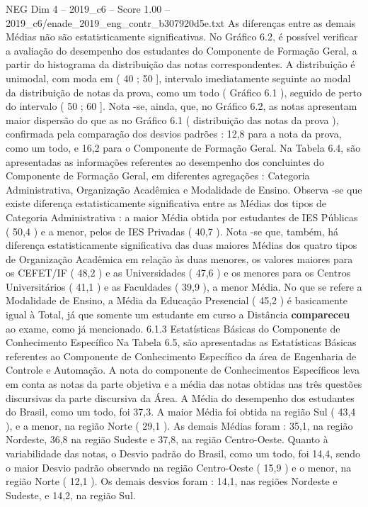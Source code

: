 \begin{textsample}{NEG Dim 4 – 2019\_c6 – Score 1.00 – 2019\_c6/enade\_2019\_eng\_contr\_b307920d5e.txt}
As diferenças entre as demais Médias não são estatisticamente significativas.
No Gráfico 6.2, é possível verificar a avaliação do desempenho dos estudantes do Componente de Formação Geral, a partir do histograma da distribuição das notas correspondentes.
A distribuição é unimodal, com moda em ( 40 ; 50 ], intervalo imediatamente seguinte ao modal da distribuição de notas da prova, como um todo ( Gráfico 6.1 ), seguido de perto do intervalo ( 50 ; 60 ].
Nota -se, ainda, que, no Gráfico 6.2, as notas apresentam maior dispersão do que as no Gráfico 6.1 ( distribuição das notas da prova ), confirmada pela comparação dos desvios padrões : 12,8 para a nota da prova, como um todo, e 16,2 para o Componente de Formação Geral.
Na Tabela 6.4, são apresentadas as informações referentes ao desempenho dos concluintes do Componente de Formação Geral, em diferentes agregações : Categoria Administrativa, Organização Acadêmica e Modalidade de Ensino.
Observa -se que existe diferença estatisticamente significativa entre as Médias dos tipos de Categoria Administrativa : a maior Média obtida por estudantes de IES Públicas ( 50,4 ) e a menor, pelos de IES Privadas ( 40,7 ).
Nota -se que, também, há diferença estatisticamente significativa das duas maiores Médias dos quatro tipos de Organização Acadêmica em relação às duas menores, os valores maiores para os CEFET/IF ( 48,2 ) e as Universidades ( 47,6 ) e os menores para os Centros Universitários ( 41,1 ) e as Faculdades ( 39,9 ), a menor Média.
No que se refere a Modalidade de Ensino, a Média da Educação Presencial ( 45,2 ) é basicamente igual à Total, já que somente um estudante em curso a Distância \textbf{compareceu} ao exame, como já mencionado. 6.1.3 Estatísticas Básicas do Componente de Conhecimento Específico Na Tabela 6.5, são apresentadas as Estatísticas Básicas referentes ao Componente de Conhecimento Específico da área de Engenharia de Controle e Automação.
A nota do componente de Conhecimentos Específicos leva em conta as notas da parte objetiva e a média das notas obtidas nas três questões discursivas da parte discursiva da Área.
A Média do desempenho dos estudantes do Brasil, como um todo, foi 37,3.
A maior Média foi obtida na região Sul ( 43,4 ), e a menor, na região Norte ( 29,1 ).
As demais Médias foram : 35,1, na região Nordeste, 36,8 na região Sudeste e 37,8, na região Centro-Oeste.
Quanto à variabilidade das notas, o Desvio padrão do Brasil, como um todo, foi 14,4, sendo o maior Desvio padrão observado na região Centro-Oeste ( 15,9 ) e o menor, na região Norte ( 12,1 ).
Os demais desvios foram : 14,1, nas regiões Nordeste e Sudeste, e 14,2, na região Sul.

\end{textsample}
